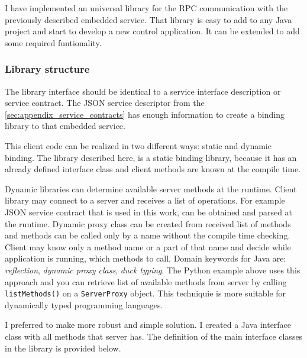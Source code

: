 I have implemented an universal library for the RPC communication with the
previously described embedded service. That library is easy to add to any Java
project and start to develop a new control application. 
It can be extended to add some required funtionality.
 
\subsubsection{Library structure}

The library interface should be identical to a service interface description
or service contract. The JSON service descriptor from the
\autoref{sec:appendix_service_contracts} has enough information to create a
binding library to that embedded service.

This client code can be realized in two different ways: static and dynamic binding.
The library described here, is a static binding library, because it has an already 
defined interface class and client methods are known at the compile time.

Dynamic libraries can determine available server methods at the runtime. Client
library may connect to a server and receives a list of operations. For example JSON
service contract that is used in this work, can be obtained and parsed at the runtime. Dynamic proxy
class can be created from received list of methods and methods can be called
only by a name without the compile time checking. Client may know only a method
name or a part of that name and decide while application is running, which
methods to call. Domain keywords for Java are: \textit{reflection}, \textit{dynamic proxy
class}, \textit{duck typing}. 
The Python example above uses this approach and
you can retrieve list of available methods from server by calling
\texttt{listMethods()} on a \texttt{ServerProxy} object. 
This techniquie is more suitable for dynamically typed programming languages. 

I preferred to make more robust and simple solution. I created a Java
interface class with all methods that server has. 
The definition of the main interface classes in the library is provided below.

